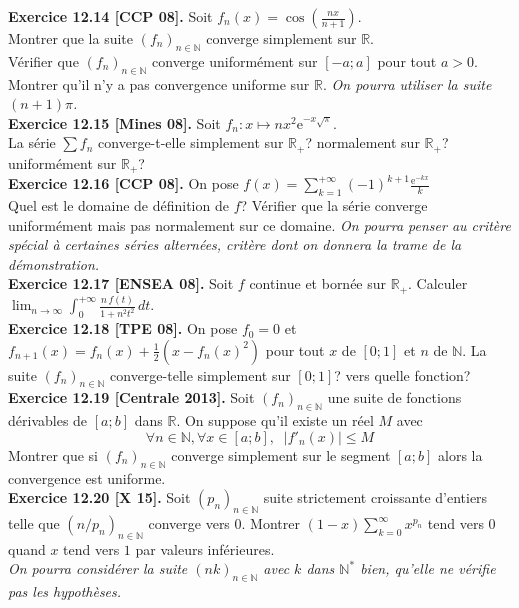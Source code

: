 \documentclass[a4paper,12pt,francais]{article}
\newcommand{\field}[1]{\mathbb{#1}}
\newcommand{\N}{\field{N}}
\newcommand{\R}{\field{R}}
\newcommand{\e}{\mbox{e}}
\begin{document}
\noindent
{\bf Exercice 12.14 [CCP 08].} Soit $f_n(x)=\cos \left(\frac{nx}{n+1}\right)$. \\
 Montrer que la suite $(f_n)_{n \in \N}$ converge simplement sur $\R$.\\
 Vérifier que $(f_n)_{n \in \N}$ converge uniformément sur $[-a;a]$ pour tout $a>0$.\\
 Montrer qu'il n'y a pas convergence uniforme sur $\R$. {\it On pourra utiliser la suite $(n+1)\pi$.}\\

\noindent
{\bf Exercice 12.15 [Mines 08].} Soit $f_n : x \mapsto nx^2 \e^{-x \sqrt{\pi}}$.\\
La série $\sum f_n$ converge-t-elle simplement sur $\R_+$? normalement sur $\R_+$?  uniformément sur $\R_+$?\\

\noindent
{\bf Exercice 12.16 [CCP 08].} On pose $f(x)=\displaystyle \sum_{k=1}^{+\infty} (-1)^{k+1} \frac{\e^{-kx}}{k}$\\
Quel est le domaine de définition de $f$? Vérifier que la série converge uniformément mais pas normalement sur ce domaine. {\it On pourra penser au critère spécial à certaines séries alternées, critère dont on donnera la trame de la démonstration.}\\

\noindent
{\bf Exercice 12.17 [ENSEA 08].} Soit $f$ continue et bornée sur $\R_+$. Calculer $\displaystyle \lim_{n\to \infty} \int_0^{+\infty} \frac{n\, f(t)}{1+n^2t^2} \, dt$.\\

\noindent
{\bf Exercice 12.18 [TPE 08].} On pose $f_0=0$ et $f_{n+1}(x)=f_n(x)+\frac{1}{2} (x-f_n(x)^2)$ pour tout $x$ de $[0;1]$ et $n$ de $\N$. La suite $(f_n)_{n\in \N}$ converge-telle simplement sur $[0;1]$? vers quelle fonction?\\

\noindent
{\bf Exercice 12.19 [Centrale 2013].} Soit $(f_n)_{n \in \N}$ une suite de fonctions dérivables de $[a;b]$ dans $\R$. On suppose qu'il existe un réel $M$ avec 
$$\forall n \in \N, \forall x \in [a;b],\; \; |f'_n(x)| \leqslant M$$
Montrer que si $(f_n)_{n \in \N}$ converge simplement sur le segment $[a;b]$ alors la convergence est uniforme.\\

\noindent
{\bf Exercice 12.20 [X 15].} Soit $(p_n)_{n\in \N}$ suite strictement croissante d'entiers telle que $(n/p_n)_{n \in \N}$ converge vers $0$. Montrer $\displaystyle (1-x) \sum_{k=0}^\infty x^{p_n}$ tend vers $0$ quand $x$ tend vers $1$ par valeurs inférieures.\\
{\it On pourra considérer la suite $(nk)_{n \in \N}$ avec $k$ dans $\N^*$ bien, qu'elle ne vérifie pas les hypothèses.}\\
\end{document}
